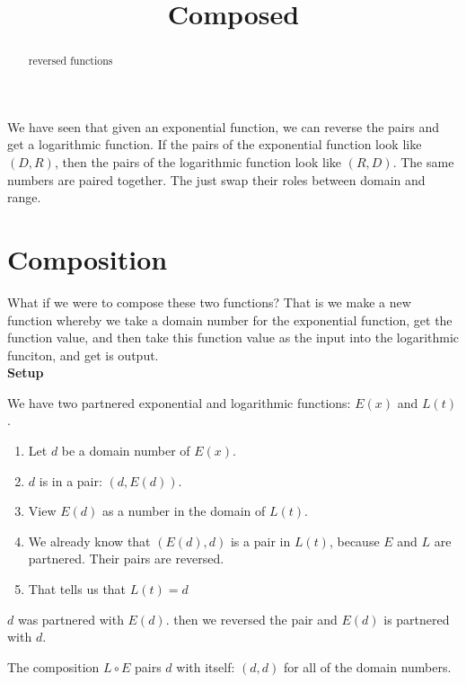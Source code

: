 \documentclass{ximera}
\title{Composed}
\begin{document}
\begin{abstract}
reversed functions
\end{abstract}
\maketitle







We have seen that given an exponential function, we can reverse the pairs and get a logarithmic function.  If the pairs of the exponential function look like $(D,R)$, then the pairs of the logarithmic function look like $(R,D)$.  The same numbers are paired together.  The just swap their roles between domain and range.

\section{Composition}

What if we were to compose these two functions?  That is we make a new function whereby we take a domain number for the exponential function, get the function value, and then take this function value as the input into the logarithmic funciton, and get is output. \\





\textbf{Setup}

We have two partnered exponential and logarithmic functions: $E(x)$ and $L(t)$.  \\

\begin{enumerate}
\item Let $d$ be a domain number of $E(x)$.
\item $d$ is in a pair: $(d, E(d))$.
\item View $E(d)$ as a number in the domain of $L(t)$.
\item We already know that $(E(d),d)$ is a pair in $L(t)$, because $E$ and $L$ are partnered.  Their pairs are reversed.
\item That tells us that $L(t)=d$
\end{enumerate}



$d$ was partnered with $E(d)$.  then we reversed the pair and $E(d)$ is partnered with $d$.

The composition $L \circ E$ pairs $d$ with itself: $(d,d)$ for all of the domain numbers. \\
\end{document}
